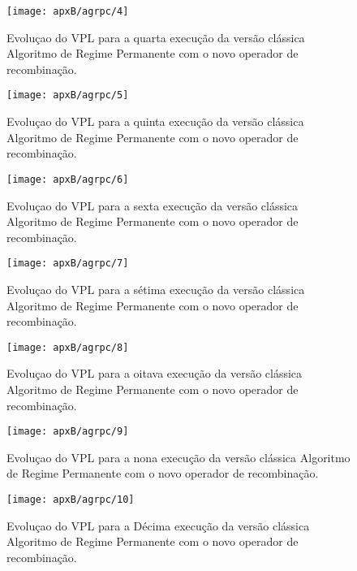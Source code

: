 \begin{figure}[H]
\centering
\texttt{[image: apxB/agrpc/4]}
\caption{Evoluçao do VPL para a quarta execução da versão clássica Algoritmo de Regime Permanente com o novo operador de recombinação.}
\label{fig:graphRPC2-04}
\end{figure}

\begin{figure}[H]
\centering
\texttt{[image: apxB/agrpc/5]}
\caption{Evoluçao do VPL para a quinta execução da versão clássica Algoritmo de Regime Permanente com o novo operador de recombinação.}
\label{fig:graphRPC2-05}
\end{figure}

\begin{figure}[H]
\centering
\texttt{[image: apxB/agrpc/6]}
\caption{Evoluçao do VPL para a sexta execução da versão clássica Algoritmo de Regime Permanente com o novo operador de recombinação.}
\label{fig:graphRPC2-06}
\end{figure}

\begin{figure}[H]
\centering
\texttt{[image: apxB/agrpc/7]}
\caption{Evoluçao do VPL para a sétima execução da versão clássica Algoritmo de Regime Permanente com o novo operador de recombinação.}
\label{fig:graphRPC2-07}
\end{figure}

\begin{figure}[H]
\centering
\texttt{[image: apxB/agrpc/8]}
\caption{Evoluçao do VPL para a oitava execução da versão clássica Algoritmo de Regime Permanente com o novo operador de recombinação.}
\label{fig:graphRPC2-08}
\end{figure}


\begin{figure}[H]
\centering
\texttt{[image: apxB/agrpc/9]}
\caption{Evoluçao do VPL para a nona execução da versão clássica Algoritmo de Regime Permanente com o novo operador de recombinação.}
\label{fig:graphRPC2-09}
\end{figure}

\begin{figure}[H]
\centering
\texttt{[image: apxB/agrpc/10]}
\caption{Evoluçao do VPL para a Décima execução da versão clássica Algoritmo de Regime Permanente com o novo operador de recombinação.}
\label{fig:graphRPC2-10}
\end{figure}